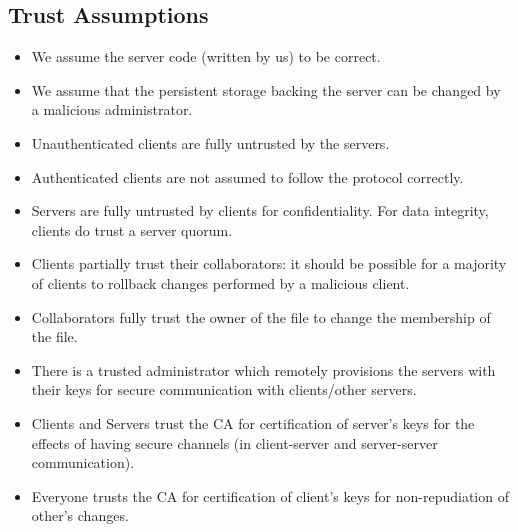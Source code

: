 \subsection{Trust Assumptions}
\begin{itemize}
    \setlength{\itemsep}{0pt}
    \setlength{\parskip}{0pt}
    \setlength{\parsep}{0pt}
    \item We assume the server code (written by us) to be correct.
    
    \item We assume that the persistent storage backing the server
	can be changed by a malicious administrator.

    \item Unauthenticated clients are fully untrusted by the servers.

    \item Authenticated clients are not assumed to follow the protocol
        correctly.

    \item Servers are fully untrusted by clients for confidentiality.
        For data integrity, clients do trust a server quorum.

    \item Clients partially trust their collaborators: it should
	be possible for a majority of clients to rollback changes
	performed by a malicious client.

    \item Collaborators fully trust the owner of the file to change
	the membership of the file.

    \item There is a trusted administrator which remotely provisions
	the servers with their keys for secure communication with
        clients/other servers.

    \item Clients and Servers trust the CA for certification of server's
	keys for the effects of having secure channels
	(in client-server and server-server communication).

    \item Everyone trusts the CA for certification of client's keys for
        non-repudiation of other's changes.
\end{itemize}
